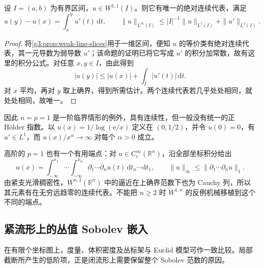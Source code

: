 \begin{proposition}\label{g3:prop:one-dimensional-critical-embedding}
	设 \(I=(a,b)\) 为有界区间，\(u\in W^{1,1}(I)\)。则它有唯一的绝对连续代表，满足
	\[
		u(y)-u(x)=\int_x^yu'(t)\,\mathrm dt,\qquad
		\|u\|_{L^\infty(I)}\le |I|^{-1}\|u\|_{L^1(I)}+\|u'\|_{L^1(I)}.
	\]
\end{proposition}
\begin{proof}
	将\cref{g3:prop:weak-line-slices}用于一维区间，便知 \(u\) 的等价类有绝对连续代表，其一元导数为弱导数 \(u'\)；该命题的证明已将它写成 \(u'\) 的积分加常数，故有这里的积分公式。对任意 \(x,y\in I\)，由此得到
	\[
		|u(y)|\le |u(x)|+\int_I|u'(t)|\,\mathrm dt.
	\]
	对 \(x\) 平均，再对 \(y\) 取上确界，得到所需估计。两个连续代表若几乎处处相同，就处处相同，故唯一。
\end{proof}

因此 \(n=p=1\) 是一阶临界情形的例外，具有连续性，但一般没有统一的正 Hölder 指数。以 \(u(x)=1/\log(\mathrm e/x)\) 定义在 \((0,1/2)\)，并令 \(u(0)=0\)，有 \(u'\in L^1\)，而 \(u(x)/x^\alpha\to\infty\) 对每个 \(\alpha>0\) 成立。

\ProseParagraphBreak

高阶的 \(p=1\) 也有一个有用端点：对 \(u\in C_c^\infty(\mathbb R^n)\)，沿全部坐标积分给出
\[
	u(x)=\int_{-\infty}^{x_1}\cdots\int_{-\infty}^{x_n}
	\partial_1\cdots\partial_nu(t)\,\mathrm dt_n\cdots\mathrm dt_1,
	\qquad \|u\|_\infty\le\|\partial_1\cdots\partial_nu\|_1.
\]
由紧支光滑稠密性，\(W^{n,1}(\mathbb R^n)\) 中的逼近在上确界范数下也为 Cauchy 列，所以其元素有在无穷远趋零的连续代表。不能把 \(n\ge2\) 时 \(W^{1,n}\) 的反例机械移植到这个不同的端点。

\subsection{紧流形上的丛值 Sobolev 嵌入}
\label{g3:subsec:1103:05}
在有限个坐标图上，度量、体积密度及丛标架与 Euclid 模型可作一致比较。局部截断所产生的低阶项，正是闭流形上需要保留整个 Sobolev 范数的原因。


